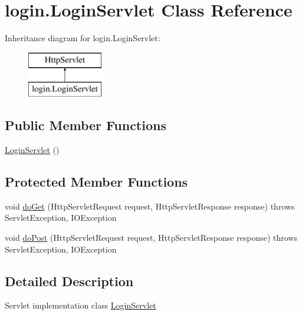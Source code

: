 \hypertarget{classlogin_1_1_login_servlet}{}\section{login.\+Login\+Servlet Class Reference}
\label{classlogin_1_1_login_servlet}
Inheritance diagram for login.\+Login\+Servlet\+:\begin{figure}[H]
\begin{center}
\leavevmode
\includegraphics[height=2.000000cm]{classlogin_1_1_login_servlet}
\end{center}
\end{figure}
\subsection*{Public Member Functions}
\begin{DoxyCompactItemize}
\item 
\hyperlink{classlogin_1_1_login_servlet_af8c37b0240335c1641b25c63522a974d}{Login\+Servlet} ()
\end{DoxyCompactItemize}
\subsection*{Protected Member Functions}
\begin{DoxyCompactItemize}
\item 
void \hyperlink{classlogin_1_1_login_servlet_a983f5828fbf3bb2e11488db56fd2e4e2}{do\+Get} (Http\+Servlet\+Request request, Http\+Servlet\+Response response)  throws Servlet\+Exception, I\+O\+Exception 
\item 
void \hyperlink{classlogin_1_1_login_servlet_a64cfb5af5fdfe51e081b7004a54b1404}{do\+Post} (Http\+Servlet\+Request request, Http\+Servlet\+Response response)  throws Servlet\+Exception, I\+O\+Exception 
\end{DoxyCompactItemize}


\subsection{Detailed Description}
Servlet implementation class \hyperlink{classlogin_1_1_login_servlet}{Login\+Servlet} 

